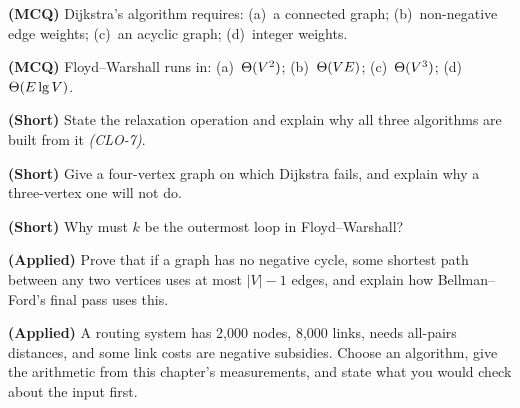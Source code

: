 \begin{reviewq}
  \item \textbf{(MCQ)} Dijkstra's algorithm requires: (a)~a connected graph;
        (b)~non-negative edge weights; (c)~an acyclic graph; (d)~integer
        weights.
  \item \textbf{(MCQ)} Floyd--Warshall runs in: (a)~$\Theta(V^{2})$;
        (b)~$\Theta(VE)$; (c)~$\Theta(V^{3})$; (d)~$\Theta(E\operatorname{lg} V)$.
  \item \textbf{(Short)} State the relaxation operation and explain why all
        three algorithms are built from it \emph{(CLO-7)}.
  \item \textbf{(Short)} Give a four-vertex graph on which Dijkstra fails, and
        explain why a three-vertex one will not do.
  \item \textbf{(Short)} Why must $k$ be the outermost loop in
        Floyd--Warshall?
  \item \textbf{(Applied)} Prove that if a graph has no negative cycle, some
        shortest path between any two vertices uses at most $|V|-1$ edges, and
        explain how Bellman--Ford's final pass uses this.
  \item \textbf{(Applied)} A routing system has 2{,}000 nodes, 8{,}000 links,
        needs all-pairs distances, and some link costs are negative subsidies.
        Choose an algorithm, give the arithmetic from this chapter's
        measurements, and state what you would check about the input first.
\end{reviewq}
